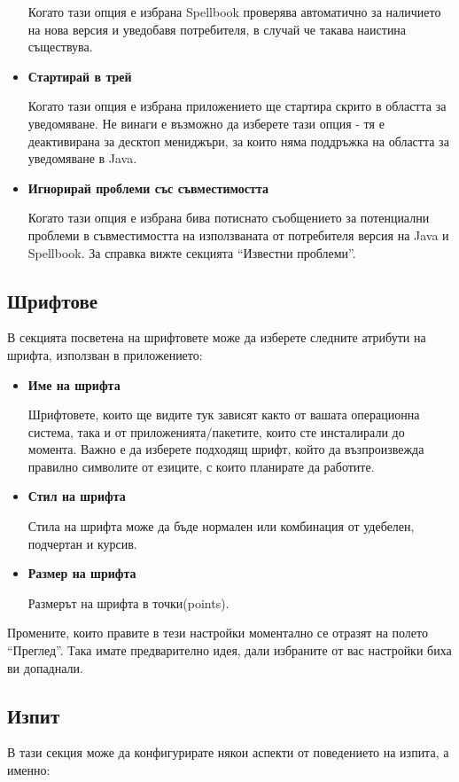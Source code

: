 \begin{itemize}
    Когато тази опция е избрана Spellbook проверява автоматично за
    наличието на нова версия и уведобавя потребителя, в случай че
    такава наистина съществува.
  \item \textbf{Стартирай в трей}
    
    Когато тази опция е избрана приложението ще стартира скрито в
    областта за уведомяване. Не винаги е възможно да изберете тази
    опция - тя е деактивирана за десктоп мениджъри, за които няма
    поддръжка на областта за уведомяване в Java.
  \item \textbf{Игнорирай проблеми със съвместимостта}

    Когато тази опция е избрана бива потиснато съобщението за
    потенциални проблеми в съвместимостта на използваната от
    потребителя версия на Java и Spellbook. За справка вижте секцията
    "`Известни проблеми"'.
\end{itemize}
\subsection{Шрифтове}
В секцията посветена на шрифтовете може да изберете следните атрибути
на шрифта, използван в приложението:

\begin{itemize}
  \item \textbf{Име на шрифта}

    Шрифтовете, които ще видите тук зависят както от вашата
    операционна система, така и от приложенията/пакетите, които сте
    инсталирали до момента. Важно е да изберете подходящ шрифт, който
    да възпроизвежда правилно символите от езиците, с които планирате
    да работите.
  \item \textbf{Стил на шрифта}

    Стила на шрифта може да бъде нормален или комбинация от удебелен,
    подчертан и курсив.
  \item \textbf{Размер на шрифта}

    Размерът на шрифта в точки(points). 
\end{itemize}

Промените, които правите в тези настройки моментално се отразят на
полето "`Преглед"'. Така имате предварително идея, дали избраните от
вас настройки биха ви допаднали.
\subsection{Изпит}

В тази секция може да конфигурирате някои аспекти от поведението на
изпита, а именно:

